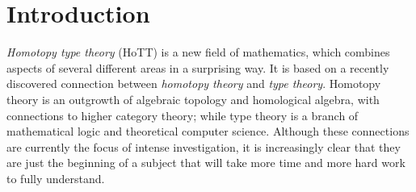 \chapter*{Introduction}
\label{cha:introduction}


{%


\newcommand{\idtypevar}{{{\sf Id}}}
\newcommand{\eq}{{{\sf Eq}}}



%
%
%
%
%
%
%
%

\emph{Homotopy type theory} (HoTT) is a new field of mathematics, which combines aspects of several different areas in a surprising way.
It is based on a recently discovered connection between \emph{homotopy theory} and \emph{type theory}.
Homotopy theory is an outgrowth of algebraic topology and homological algebra, with connections to higher category theory; while type theory is a branch of mathematical logic and theoretical computer science.
Although these connections are currently the focus of intense investigation, it is increasingly clear that they are just the beginning of a subject that will take more time and more hard work to fully understand.

}
